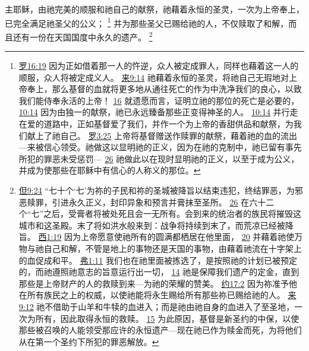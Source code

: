 \documentclass[12pt, a4paper, oneside]{ctexart}
\newcounter{parnum}[section]
\newcommand{\N}{%
   \noindent\refstepcounter{parnum}%
    \makebox[\parindent][l]{\textbf{\arabic{parnum}.}}}
\begin{document}
\N 主耶稣，由祂完美的顺服和祂自己的献祭，祂藉着永恒的圣灵，一次为上帝奉上，已完全满足祂圣父的公义；
	\footnote {
		\href{https://biblehub.com/romans/5-19.htm}{罗16:19} 因为正如借着那一人的忤逆，众人被定成罪人，同样也藉着这一人的顺服，众人将被定成义人。
		\href{https://biblehub.com/hebrews/9-14.htm}{来9:14} 祂藉着永恒的圣灵，将祂自己无瑕地对上帝奉上，那么基督的血就将更多地从通往死亡的作为中洗净我们的良心，以致我们能侍奉永活的上帝！
		\href{https://biblehub.com/hebrews/9-16.htm}{16} 就遗愿而言，证明立祂的那位的死亡是必要的，
		\href{https://biblehub.com/hebrews/10-14.htm}{10:14} 因为由独一的献祭，祂已永远臻备那些正变得神圣的人。
		\href{https://biblehub.com/ephesians/5-2.htm}{10:14} 并行走在爱的道路中，正如基督爱了我们，并作一个为上帝的香甜供品和献祭，为我们献上了祂自己。
		\href{https://biblehub.com/romans/3-25.htm}{罗3:25} 上帝将基督赠送作赎罪的献祭，藉着祂的血的流出---来被信心领受。祂做这以显明祂的正义，因为在祂的克制中，祂已留有事先所犯的罪恶未受惩罚---
		\href{https://biblehub.com/romans/3-26.htm}{26} 祂做此以在现时显明祂的正义，以至于成为公义，并成为使那些在耶稣中有信心的人称义的那位。
	}
	并为那些圣父已赐给祂的人，不仅赎取了和解，而且还有一份在天国国度中永久的遗产。
	\footnote {
		\href{https://biblehub.com/daniel/9-24.htm}{但9:24} “七十个‘七’为祢的子民和祢的圣城被降旨以结束违犯，终结罪恶，为邪恶赎罪，引进永久正义，封印异象和预言并膏抹至圣所。
		\href{https://biblehub.com/daniel/9-26.htm}{26} 在六十二个“七”之后，受膏者将被处死且会一无所有。会到来的统治者的族民将摧毁这城市和这圣殿。末了将如洪水般来到：战争将持续到末了，而荒凉已经被降旨。
		\href{https://biblehub.com/colossians/1-19.htm}{西1:19} 因为上帝愿意使祂所有的圆满都栖居在他里面，
		\href{https://biblehub.com/colossians/1-20.htm}{20} 并藉着祂使万物与祂自己和解，不管是地上的事物还是天国的事物，由藉着祂流在十字架上的血促成和平。
		\href{https://biblehub.com/ephesians/1-11.htm}{弗1:11} 我们也在祂里面被拣选了，是按照祂的计划已被预定的，而祂遵照祂意志的旨意运行出一切，
		\href{https://biblehub.com/ephesians/1-14.htm}{14} 祂是保障我们遗产的定金，直到那些是上帝财产的人的救赎到来---为祂的荣耀的赞美。
		\href{https://biblehub.com/john/17-2.htm}{约17:2} 因为祢准予他在所有族民之上的权威，以使祂能将永生赐给所有那些祢已赐给祂的人。
		\href{https://biblehub.com/hebrews/9-12.htm}{来9:12} 祂不借助于山羊和牛犊的血进入；而是祂由祂自身的血进入了至圣地，一次为所有，因此取得永恒的救赎。
		\href{https://biblehub.com/hebrews/9-15.htm}{15} 为此原因，基督是新圣约的中保，以使那些被召唤的人能领受那应许的永恒遗产---现在祂已作为赎金而死，为将他们从在第一个圣约下所犯的罪恶解放。
	}
\end{document}
